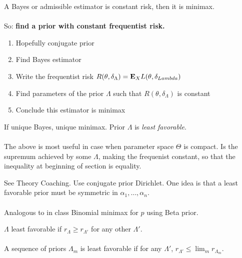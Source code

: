 \documentclass{article}
\begin{document}
\begin{recipe}
	A Bayes or admissible estimator is constant risk, then it is minimax. \\\\
	
	So: \textbf{find a prior with constant frequentist risk. }
	\begin{enumerate}
		\item Hopefully conjugate prior
		\item Find Bayes estimator 
		\item Write the frequentist risk $R(\theta,\delta_{\Lambda}) = \mathbf{E}_X L(\theta, \delta_{Lambda})$
		\item Find parameters of the prior $\Lambda$ such that $R(\theta,\delta_\Lambda)$ is constant
		\item Conclude this estimator is minimax
	\end{enumerate}
	If unique Bayes, unique minimax. Prior $\Lambda$ is \textit{least favorable}.\\ \\ 
	
	The above is most useful in case when parameter space $\Theta$ is compact. Is the supremum achieved by some $\Lambda$, making the frequenist constant, so that the inequality at beginning of section is equality. 
\end{recipe}

\begin{example}
See Theory Coaching. Use conjugate prior Dirichlet. One idea is that a least favorable prior must be symmetric in $\alpha_1,\ldots, \alpha_n$. \\ \\ 

Analogous to in class Binomial minimax for $p$ using Beta prior. 
\end{example}

\begin{definition}
$\Lambda$ least favorable if $r_\Lambda \geq r_{\Lambda'}$ for any other $\Lambda'$. \\\\
A sequence of priors $\Lambda_m$ is least favorable if for any $\Lambda'$, $r_{\Lambda'} \leq \lim_m r_{\Lambda_m}$.
\end{definition}
\end{document}

